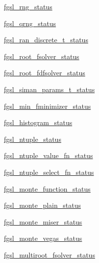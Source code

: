 \begin{DoxyCompactItemize}
\item 
\hyperlink{interfacefgsl__well__defined_ab4562e7727a12c9dac1a81d3b431def1}{fgsl\-\_\-rng\-\_\-status}
\item 
\hyperlink{interfacefgsl__well__defined_a766e94d592780ef94a96d85e80940d6d}{fgsl\-\_\-qrng\-\_\-status}
\item 
\hyperlink{interfacefgsl__well__defined_ade977ef8bf64edf0d4d61b5cef9be9e2}{fgsl\-\_\-ran\-\_\-discrete\-\_\-t\-\_\-status}
\item 
\hyperlink{interfacefgsl__well__defined_a831b4f766e394ed2ee2d241f4f1c90de}{fgsl\-\_\-root\-\_\-fsolver\-\_\-status}
\item 
\hyperlink{interfacefgsl__well__defined_ad5c1a94585fc6e4f967e7d5ed84e91c1}{fgsl\-\_\-root\-\_\-fdfsolver\-\_\-status}
\item 
\hyperlink{interfacefgsl__well__defined_a017f6400ef2108e70f2565170176b249}{fgsl\-\_\-siman\-\_\-params\-\_\-t\-\_\-status}
\item 
\hyperlink{interfacefgsl__well__defined_aa13ac622192d0099afcfed0388a5f7a2}{fgsl\-\_\-min\-\_\-fminimizer\-\_\-status}
\item 
\hyperlink{interfacefgsl__well__defined_aed67793dbe54a71adb40f2756ecd831f}{fgsl\-\_\-histogram\-\_\-status}
\item 
\hyperlink{interfacefgsl__well__defined_ad390488295454f78ff1aa39132cbaba3}{fgsl\-\_\-ntuple\-\_\-status}
\item 
\hyperlink{interfacefgsl__well__defined_a459a96eb9f367db719ae038877f29d12}{fgsl\-\_\-ntuple\-\_\-value\-\_\-fn\-\_\-status}
\item 
\hyperlink{interfacefgsl__well__defined_afbd6733bbbdcbb08fec31a968ac5559d}{fgsl\-\_\-ntuple\-\_\-select\-\_\-fn\-\_\-status}
\item 
\hyperlink{interfacefgsl__well__defined_a9f89c4981bf5ec10c4864190ed091b9c}{fgsl\-\_\-monte\-\_\-function\-\_\-status}
\item 
\hyperlink{interfacefgsl__well__defined_a7d1ea58e14757a223b0b2003719798e1}{fgsl\-\_\-monte\-\_\-plain\-\_\-status}
\item 
\hyperlink{interfacefgsl__well__defined_a5ec0ede38be5235101fcbefeaa8df151}{fgsl\-\_\-monte\-\_\-miser\-\_\-status}
\item 
\hyperlink{interfacefgsl__well__defined_a4d9dfa2b76cddc54d9bcf0f0ab1c5fe4}{fgsl\-\_\-monte\-\_\-vegas\-\_\-status}
\item 
\hyperlink{interfacefgsl__well__defined_a72acddc2a0e9fb582d73528ed3789ef1}{fgsl\-\_\-multiroot\-\_\-fsolver\-\_\-status}

\end{DoxyCompactItemize}
